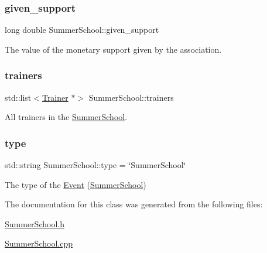 \subsubsection{\texorpdfstring{given\+\_\+support}{given\_support}}
{\footnotesize\ttfamily long double Summer\+School\+::given\+\_\+support\hspace{0.3cm}{\ttfamily [private]}}



The value of the monetary support given by the association. 

\mbox{\label{classSummerSchool_a3208a977c13ce8d7415b179a040efae3}} 
\subsubsection{\texorpdfstring{trainers}{trainers}}
{\footnotesize\ttfamily std\+::list$<$\hyperlink{classTrainer}{Trainer} $\ast$$>$ Summer\+School\+::trainers\hspace{0.3cm}{\ttfamily [private]}}



All trainers in the \hyperlink{classSummerSchool}{Summer\+School}. 

\mbox{\label{classSummerSchool_a4bce94c462b492844cacce921427d212}} 
\subsubsection{\texorpdfstring{type}{type}}
{\footnotesize\ttfamily std\+::string Summer\+School\+::type = \char`\"{}Summer\+School\char`\"{}\hspace{0.3cm}{\ttfamily [private]}}



The type of the \hyperlink{classEvent}{Event} (\hyperlink{classSummerSchool}{Summer\+School}) 



The documentation for this class was generated from the following files\+:\begin{DoxyCompactItemize}
\item 
\hyperlink{SummerSchool_8h}{Summer\+School.\+h}\item 
\hyperlink{SummerSchool_8cpp}{Summer\+School.\+cpp}\end{DoxyCompactItemize}
